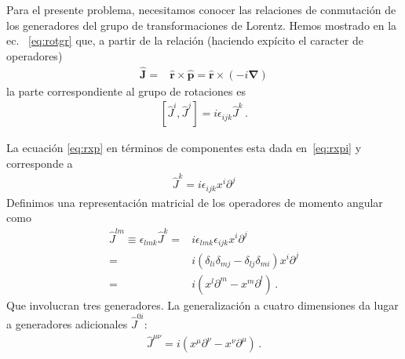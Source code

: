 \begin{frame}
Para el presente problema, necesitamos conocer las relaciones de conmutación de los generadores del grupo de transformaciones de Lorentz. Hemos mostrado en la ec.~ \eqref{eq:rotgr}  que, a partir de la relación (haciendo expícito el caracter de operadores)
\begin{align}
\label{eq:rxp}
  \widehat{\mathbf{J}}=&\widehat{\mathbf{r}}\times \widehat{\mathbf{p}}=
\widehat{\mathbf{r}}\times (-i\boldsymbol{\nabla})
\end{align}
la parte correspondiente al grupo de rotaciones es
\begin{align*}
  \left[\widehat{J}^i,\widehat{J}^j\right]=i\epsilon_{ijk}\widehat{J}^k\,.
\end{align*}

La ecuación \eqref{eq:rxp} en términos de componentes esta dada en~\eqref{eq:rxpi} y corresponde a
\begin{align}
  \widehat{J}^k=i\epsilon_{ijk}x^i\partial^j
\end{align}
Definimos una representación matricial de los operadores de momento angular como
\begin{align}
  \widehat{J}^{l m}\equiv\epsilon_{lmk}\widehat{J}^k=&i\epsilon_{lmk}\epsilon_{ijk}x^i\partial^j\nonumber\\
=&i(\delta_{li}\delta_{mj}-\delta_{lj}\delta_{mi})x^i\partial^j\nonumber\\
=&i(x^l\partial^m-x^m\partial^l)\,.
\end{align}
  Que involucran tres generadores. La generalización a cuatro dimensiones da lugar a generadores adicionales $\widehat{J}^{0i}$:
\begin{align}
  \widehat{J}^{\mu\nu}=i(x^\mu\partial^\nu-x^\nu\partial^\mu)\,.
\end{align}
\end{frame}
